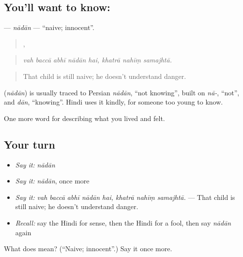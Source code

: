 \subsection*{You'll want to know: }
\textbf{} — \emph{nādān} — \textquotedblleft{}naive; innocent\textquotedblright{}.

\begin{quote}
    ,   
\end{quote}

\begin{quote}
\emph{vah baccā abhī nādān hai, khatrā nahīṃ samajhtā.}
\end{quote}

\begin{quote}
That child is still naive; he doesn't understand danger.
\end{quote}

\begin{cousinweb}
\textbf{} (\emph{nādān}) is usually traced to Persian \emph{nādān}, \textquotedblleft{}not knowing\textquotedblright{}, built on \emph{nā-}, \textquotedblleft{}not\textquotedblright{}, and \emph{dān}, \textquotedblleft{}knowing\textquotedblright{}. Hindi uses it kindly, for someone too young to know.
\end{cousinweb}

\begin{grammarlens}[title={What you've built}]
One more word for describing what you lived and felt.
\end{grammarlens}

\subsection*{Your turn}
\begin{itemize}
\raggedright
  \item \emph{Say it:} \emph{nādān}
  \item \emph{Say it:} \emph{nādān}, once more
  \item \emph{Say it:} \emph{vah baccā abhī nādān hai, khatrā nahīṃ samajhtā.} — That child is still naive; he doesn't understand danger.
  \item \emph{Recall:} say the Hindi for sense, then the Hindi for a fool, then say \emph{nādān} again
\end{itemize}

\begin{tcolorbox}[breakable,colback=teal!4,colframe=teal!35!black,title={Before you move on}]
What does  mean? (\textquotedblleft{}Naive; innocent\textquotedblright{}.) Say it once more.
\end{tcolorbox}
